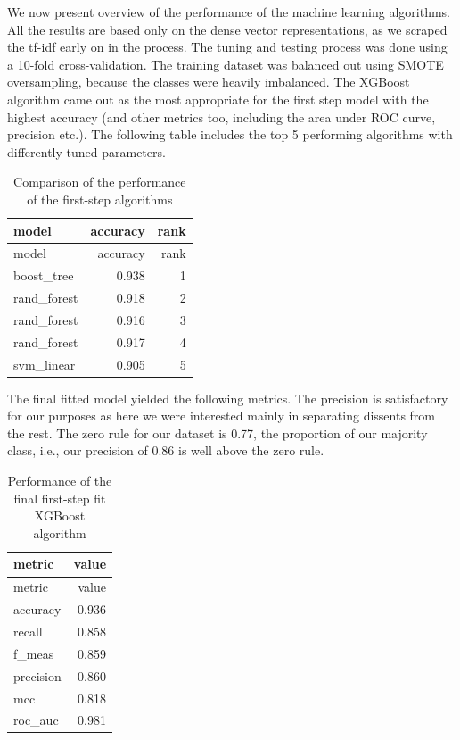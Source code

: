 \documentclass[
  11pt,
]{article}
\begin{document}
We now present overview of the performance of the machine learning
algorithms. All the results are based only on the dense vector
representations, as we scraped the tf-idf early on in the process. The
tuning and testing process was done using a 10-fold cross-validation.
The training dataset was balanced out using SMOTE oversampling, because
the classes were heavily imbalanced. The XGBoost algorithm came out as
the most appropriate for the first step model with the highest accuracy
(and other metrics too, including the area under ROC curve, precision
etc.). The following table includes the top 5 performing algorithms with
differently tuned parameters.

\begin{longtable}[]{@{}lrr@{}}
\caption{Comparison of the performance of the first-step
algorithms}\tabularnewline
\toprule\noalign{}
model & accuracy & rank \\
\midrule\noalign{}
\endfirsthead
\toprule\noalign{}
model & accuracy & rank \\
\midrule\noalign{}
\endhead
\bottomrule\noalign{}
\endlastfoot
boost\_tree & 0.938 & 1 \\
rand\_forest & 0.918 & 2 \\
rand\_forest & 0.916 & 3 \\
rand\_forest & 0.917 & 4 \\
svm\_linear & 0.905 & 5 \\
\end{longtable}

The final fitted model yielded the following metrics. The precision is
satisfactory for our purposes as here we were interested mainly in
separating dissents from the rest. The zero rule for our dataset is
0.77, the proportion of our majority class, i.e., our precision of 0.86
is well above the zero rule.

\begin{longtable}[]{@{}lr@{}}
\caption{Performance of the final first-step fit XGBoost
algorithm}\tabularnewline
\toprule\noalign{}
metric & value \\
\midrule\noalign{}
\endfirsthead
\toprule\noalign{}
metric & value \\
\midrule\noalign{}
\endhead
\bottomrule\noalign{}
\endlastfoot
accuracy & 0.936 \\
recall & 0.858 \\
f\_meas & 0.859 \\
precision & 0.860 \\
mcc & 0.818 \\
roc\_auc & 0.981 \\
\end{longtable}
\end{document}
